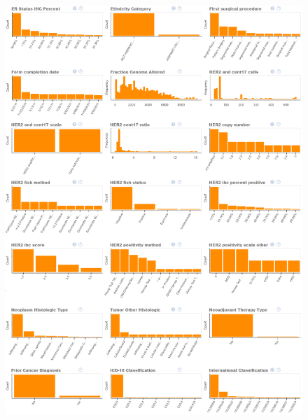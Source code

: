 \begin{figure}
	\centering
	\includegraphics[width=1
	\linewidth]{NOTEBOOK/IMAGES_EDA/2}
\end{figure}

